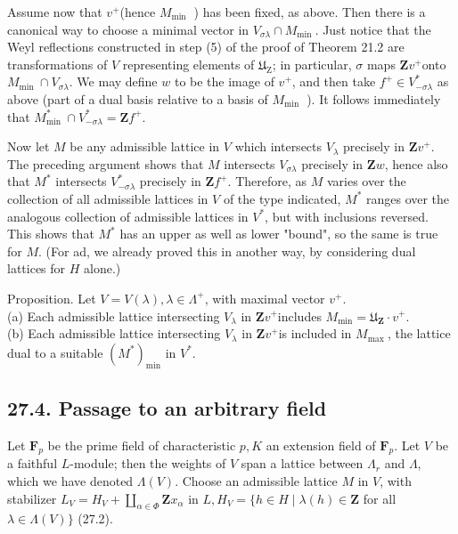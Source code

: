 \documentclass[10pt]{article}
\begin{document}
Assume now that $v^{+}$(hence $M_{\text {min }}$ ) has been fixed, as above. Then there is a canonical way to choose a minimal vector in $V_{\sigma \lambda} \cap M_{\text {min }}$. Just notice that the Weyl reflections constructed in step (5) of the proof of Theorem 21.2 are transformations of $V$ representing elements of $\mathfrak{U}_{\mathrm{Z}}$; in particular, $\sigma$ maps $\mathbf{Z} v^{+}$onto $M_{\text {min }} \cap V_{\sigma \lambda}$. We may define $w$ to be the image of $v^{+}$, and then take $f^{+} \in V_{-\sigma \lambda}^{*}$ as above (part of a dual basis relative to a basis of $M_{\text {min }}$ ). It follows immediately that $M_{\text {min }}^{*} \cap V_{-\sigma \lambda}^{*}=\mathbf{Z} f^{+}$.

Now let $M$ be any admissible lattice in $V$ which intersects $V_{\lambda}$ precisely in $\mathbf{Z} v^{+}$. The preceding argument shows that $M$ intersects $V_{\sigma \lambda}$ precisely in $\mathbf{Z} w$, hence also that $M^{*}$ intersects $V_{-\sigma \lambda}^{*}$ precisely in $\mathbf{Z} f^{+}$. Therefore, as $M$ varies over the collection of all admissible lattices in $V$ of the type indicated, $M^{*}$ ranges over the analogous collection of admissible lattices in $V^{*}$, but with inclusions reversed. This shows that $M^{*}$ has an upper as well as lower "bound", so the same is true for $M$. (For ad, we already proved this in another way, by considering dual lattices for $H$ alone.)

Proposition. Let $V=V(\lambda), \lambda \in \Lambda^{+}$, with maximal vector $v^{+}$.\\
(a) Each admissible lattice intersecting $V_{\lambda}$ in $\mathbf{Z} v^{+}$includes $M_{\min }=\mathfrak{U}_{\mathbf{Z}} \cdot v^{+}$.\\
(b) Each admissible lattice intersecting $V_{\lambda}$ in $\mathbf{Z} v^{+}$is included in $M_{\text {max }}$, the lattice dual to a suitable $\left(M^{*}\right)_{\min }$ in $V^{*}$.

\subsection*{27.4. Passage to an arbitrary field}
Let $\mathbf{F}_{p}$ be the prime field of characteristic $p, K$ an extension field of $\mathbf{F}_{p}$. Let $V$ be a faithful $L$-module; then the weights of $V$ span a lattice between $\Lambda_{r}$ and $\Lambda$, which we have denoted $\Lambda(V)$. Choose an admissible lattice $M$ in $V$, with stabilizer $L_{V}=H_{V}+\coprod_{\alpha \in \Phi} \mathbf{Z} x_{\alpha}$ in $L, H_{V}=\{h \in H \mid \lambda(h) \in \mathbf{Z}$ for all $\lambda \in \Lambda(V)\}$ (27.2).
\end{document}
